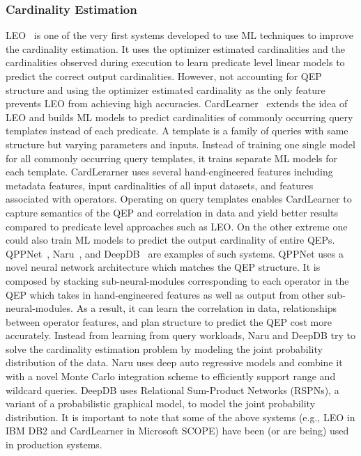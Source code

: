 \subsubsection{Cardinality Estimation}
LEO~\cite{leo} is one of the very first systems developed to use ML techniques to improve the cardinality estimation.
It uses the optimizer estimated cardinalities and the cardinalities observed during execution to learn predicate level linear models to predict the correct output cardinalities.
However, not accounting for QEP structure and using the optimizer estimated cardinality as the only feature prevents LEO from achieving high accuracies.
CardLearner~\cite{cardlearner} extends the idea of LEO and builds ML models to predict cardinalities of commonly occurring query templates instead of each predicate.
A template is a family of queries with same structure but varying parameters and inputs.
Instead of training one single model for all commonly occurring query templates, it trains separate ML models for each template.
CardLerarner uses several hand-engineered features including metadata features, input cardinalities of all input datasets, and features associated with operators.
Operating on query templates enables CardLearner to capture semantics of the QEP and correlation in data and yield better results compared to predicate level approaches such as LEO.
On the other extreme one could also train ML models to predict the output cardinality of entire QEPs.
QPPNet~\cite{qppnet}, Naru~\cite{naru}, and DeepDB~\cite{deepdb} are examples of such systems.
QPPNet uses a novel neural network architecture which matches the QEP structure.
It is composed by stacking sub-neural-modules corresponding to each operator in the QEP which takes in hand-engineered features as well as output from other sub-neural-modules.
As a result, it can learn the correlation in data, relationships between operator features, and plan structure to predict the QEP cost more accurately.
Instead from learning from query workloads, Naru and DeepDB try to solve the cardinality estimation problem by modeling the joint probability distribution of the data.
Naru uses deep auto regressive models and combine it with a novel Monte Carlo integration scheme to efficiently support range and wildcard queries.
DeepDB uses Relational Sum-Product Networks (RSPNs), a variant of a probabilistic graphical model, to model the joint probability distribution.
It is important to note that some of the above systems (e.g., LEO in IBM DB2 and CardLearner in Microsoft SCOPE) have been (or are being) used in production systems.

